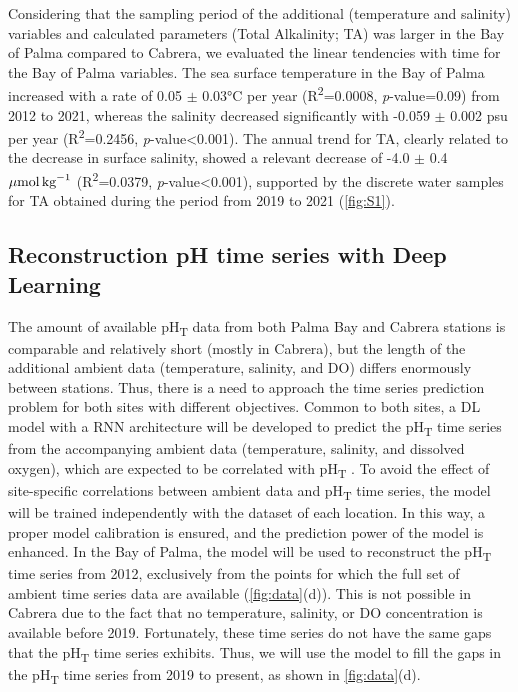 Considering that the sampling period of the additional (temperature and
salinity) variables and calculated parameters (Total Alkalinity; TA) was larger
in the Bay of Palma compared to Cabrera, we evaluated the linear tendencies
with time for the Bay of Palma variables. The sea surface temperature in the
Bay of Palma increased with a rate of 0.05 $\pm$ 0.03°C per year
(R\textsuperscript{2}=0.0008, \emph{p}-value=0.09) from 2012 to 2021, whereas
the salinity decreased significantly with -0.059 $\pm$ 0.002 psu per year
(R\textsuperscript{2}=0.2456, \emph{p}-value<0.001). The annual trend for TA,
clearly related to the decrease in surface salinity, showed a relevant decrease
of -4.0 $\pm$ 0.4 ${\mu\textrm{mol\,kg}^{-1}}$ (R\textsuperscript{2}=0.0379,
\emph{p}-value<0.001), supported by the discrete water samples for TA obtained
during the period from 2019 to 2021  (\cref{fig:S1}).

\subsection{Reconstruction pH time series with Deep Learning}

The amount of available pH\textsubscript{T} data from both Palma Bay and
Cabrera stations is comparable and relatively short (mostly in Cabrera), but
the length of the additional ambient data (temperature, salinity, and DO)
differs enormously between stations. Thus, there is a need to approach the time
series prediction problem for both sites with different objectives. Common to
both sites, a DL model with a RNN architecture will be developed to predict the
pH\textsubscript{T} time series from the accompanying ambient data
(temperature, salinity, and dissolved oxygen), which are expected to be
correlated with pH\textsubscript{T} \cite{Fourrier2020,Broullon2021}. To avoid
the effect of site-specific correlations between ambient data and
pH\textsubscript{T} time series, the model will be trained independently with
the dataset of each location. In this way, a proper model calibration is
ensured, and the prediction power of the model is enhanced. In the Bay of
Palma, the model will be used to reconstruct the pH\textsubscript{T} time
series from 2012, exclusively from the points for which the full set of ambient
time series data are available (\cref{fig:data}(d)). This is not possible in
Cabrera due to the fact that no temperature, salinity, or DO concentration is
available before 2019. Fortunately, these time series do not have the same gaps
that the pH\textsubscript{T} time series exhibits. Thus, we will use the model
to fill the gaps in the pH\textsubscript{T} time series from 2019 to present,
as shown in \cref{fig:data}(d).

